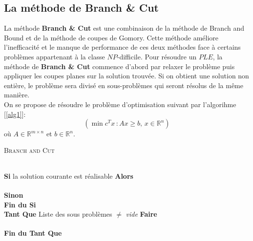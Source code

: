 \documentclass[a4paper,11pt,oneside]{report}
\renewcommand{\algorithmicwhile}{\textbf{Tant Que}}
\renewcommand{\algorithmicdo}{\textbf{Faire}}
\renewcommand{\algorithmicendwhile}{\textbf{Fin du Tant Que}}
\renewcommand{\algorithmicif}{\textbf{Si}}
\renewcommand{\algorithmicendif}{\textbf{Fin du Si}}
\renewcommand{\algorithmicelse}{\textbf{Sinon}}
\renewcommand{\algorithmicthen}{\textbf{Alors}}
\renewcommand{\algorithmicdo}{\textbf{Faire}}
\theoremstyle{plain}
\newcommand{\0}{/ \! \! \! 0}
\theoremstyle{plain}
\begin{document}
\subsection{La m\'ethode de Branch \& Cut}
La m\'ethode {\bf Branch \& Cut} est une combinaison de la m\'ethode de Branch and Bound et de la m\'ethode de coupes de Gomory. Cette m\'ethode 
am\'eliore l'inefficacit\'e et le manque de performance de ces deux m\'ethodes face \`a certains probl\`emes appartenant \`a la classe $NP$-difficile.
Pour r\'esoudre un $PLE$, la m\'ethode de {\bf Branch \& Cut} commence d'abord par relaxer le probl\`eme puis appliquer les coupes planes sur la solution
trouv\'ee. Si on obtient une solution non enti\`ere, le probl\`eme sera divis\'e en sous-probl\`emes qui seront r\'esolus de la m\^eme mani\`ere.\\
On se propose de r\'esoudre le probl\`eme d'optimisation suivant par l'algorihme [\ref{alg1}]:
\[(\min c^T x \, : Ax  \geq b ,\, x \in \mathbb{R}^n  ) \]  o\`u  $A\in \mathbb{R}^{m \times n}$ et $b\in \mathbb{R}^n$.
\begin{algorithm}
\caption{\textsc{Branch and Cut}}
\label{alg1}
\begin{algorithmic}
\ENSURE{:}
\\
\algorithmicif{ la solution courante est r\'ealisable} \algorithmicthen\\
\\ \algorithmicelse
{}\\
\algorithmicendif\\
\algorithmicwhile{   Liste des sous probl\`emes $\neq$ \emph{vide} } \algorithmicdo\\
\\
\algorithmicendwhile
\end{algorithmic}
\end{algorithm}
\end{document}
